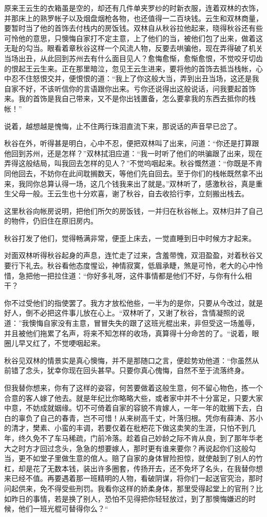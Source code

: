 \documentclass[12pt,UTF8]{ctexbook}
\begin{document}
{{{原来王云生的衣箱虽是空的，却还有几件单夹罗纱的时新衣服，连着双林的衣饰，并那床上的熟罗帐子以及烟盘烟枪各物，也还值得一二百块钱。云生和双林商量，要暂时当了他的首饰去付栈内的房饭钱。双林自从秋谷拉他起来，晓得秋谷还有些可怜他的意思，只懊悔自家打不定主意，上了他们的当，被他们包了出来，做着这无耻的勾当。眼看着章秋谷这样一个风流人物，反要去哄骗他，现在弄得破了机关当场出丑，从此回到苏州去有什么面目见人？愈悔愈惭，愈惭愈恨，不觉咬牙切齿的恨起王云生来。正在那里暗泣，忽见王云生进来，要将他的首饰去抵当栈帐，心中忍不住怒恨交并，便恨恨的道：“我上了你这般大当，弄到出丑当场，这还是我自家不好，不该听信你的言语跟你出来。亏你还说得出这般说话，问我要起首饰来。我的首饰是我自己带来，又不是你出钱置备，怎么要拿我的东西去抵你的栈帐！”

说着，越想越是愧悔，止不住两行珠泪直流下来，那说话的声音早已岔了。

秋谷在外，听得甚是明白，心中不忍，便把双林叫了出来，问道：“你还是打算跟他回到苏州，还是怎样？”双林拭泪应道：“我一时听了他们的哄骗跟了出来，现在弄得这般结局，叫我回去怎样的见人？”不觉呜咽起来。秋谷慨然道：“你既是不肯同他回去，不妨你在此间耽搁数天，等他们先自回去。至于你们的栈帐既然拿不出来，我同你总算认得一场，这几个钱我来出了就是。”双林听了，感激秋谷，真是重生父母一般。王云生也十分欢喜，谢了秋谷，自去收拾行李，立刻搬出栈去。

这里秋谷向帐房说明，把他们所欠的房饭钱，一并归在秋谷帐上。双林归并了自己的物件，仍旧住在原旧房内。

秋谷打发了他们，觉得畅满非常，便歪上床去，一觉直睡到日中时候方才起来。

对面双林听得秋谷起身的声息，连忙走了过来，含羞带愧，双泪盈盈，对着秋谷又要行下礼去。秋谷看他态度惺讼，神情寂寞，低眉承睫，煞是可怜，老大的心中怜惜，急把他一把拉住道：“你好多礼呀，这件事情都是他们不好，与你有什么相干？

你不过受他们的指使罢了。我方才放松他些，一半为的是你，只要从今改过，就是好人，倒不必把这件事儿放在心上。“双林听了，又谢了秋谷，含情凝照的说道：”我懊悔自家没有主意，冒冒失失的跟了这班光棍出来，非但受这一场羞辱，并且被他们拖累了名声，将来不知怎样的收场，真算得十分命苦的了。“说着，眼圈儿早又红了，不觉哽咽起来。

秋谷见双林的情景实是真心懊悔，并不是那随口之言，便趁势劝他道：“你虽然从前错了念头，犹幸你现在回头甚早。只要你真心傀悔，自然不至于流落终身。

但我替你想来，你有了这样的姿容，何苦要做着这般生意，何不留心物色，拣一个合意的客人嫁了他去。就是年纪比你略略大些，或者家中并不十分富足，只要大家中意，不妨成就姻缘。切不可倚着自家的容貌不肯嫁人，一年一年的耽搁下去，白白的辜负了自己的春青，岂不可惜！从来树高千丈，叶落归根。凭你有薛涛、苏小的清才，樊素、小蛮的丰调，若要仅着在枇杷花下做这卖笑的生涯，只怕不到几年，终久免不了车马稀疏，门前冷落。趁着自己妙龄之际不肯从良，到了那年华老大之时方才回过念头，急急的想要嫁人，那时更有谁来要你？再说起你们这般勾当，更不如堂子里做生意的倌人。赔了自家的身体冒险担惊，就使敲到了别人的竹杠，却是花了无数本钱，装出许多圈套，传扬开去，还不免坏了名头，在我替你想来已经不值。再要遇着那一班精明的人物，看破阴谋，将你们一起送官究治，那时问起供来，免不得受些刑罚。我看你这样的娇柔身体，那里受得起堂上的官刑？比如昨日的事情，若是换了别人，恐怕不见得把你轻轻放过，到了那懊悔嫌迟的时候，他们一班光棍可替得你么？“

}}}
\end{document}
